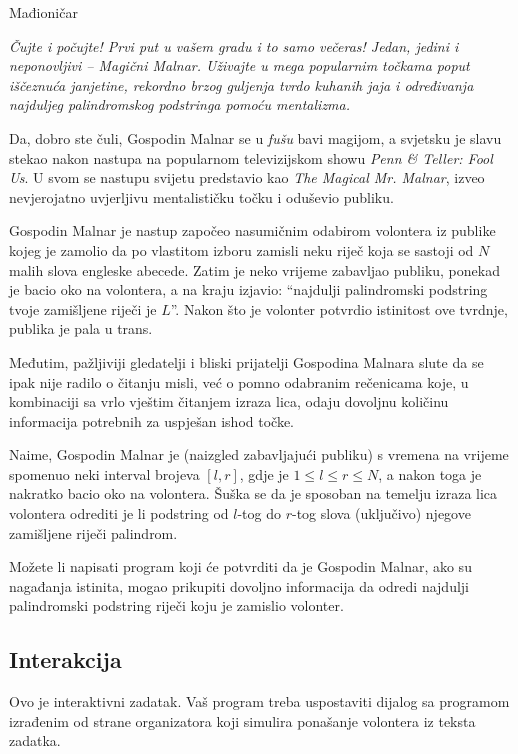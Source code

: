 \begin{statement}[
  problempoints=100,
  timelimit=1 sekunda,
  memorylimit=512 MiB,
]{Mađioničar}

\textit{Čujte i počujte! Prvi put u vašem gradu i to samo večeras! Jedan, jedini i
neponovljivi -- Magični Malnar. Uživajte u mega popularnim točkama poput
iščeznuća janjetine, rekordno brzog guljenja tvrdo kuhanih jaja i određivanja
  najduljeg palindromskog podstringa pomoću mentalizma.}

Da, dobro ste čuli, Gospodin Malnar se u \textit{fušu} bavi magijom, a svjetsku
je slavu stekao nakon nastupa na popularnom televizijskom showu
\textit{Penn \& Teller: Fool Us}. U svom se nastupu svijetu predstavio kao
\textit{The Magical Mr. Malnar}, izveo nevjerojatno uvjerljivu mentalističku
točku i oduševio publiku.

Gospodin Malnar je nastup započeo nasumičnim odabirom volontera iz publike kojeg
je zamolio da po vlastitom izboru zamisli neku riječ koja se sastoji od $N$
malih slova engleske abecede. Zatim je neko vrijeme zabavljao publiku, ponekad
je bacio oko na volontera, a na kraju izjavio: ``najdulji palindromski podstring
tvoje zamišljene riječi je $L$''. Nakon što je volonter potvrdio istinitost ove
tvrdnje, publika je pala u trans.

Međutim, pažljiviji gledatelji i bliski prijatelji Gospodina Malnara slute da
se ipak nije radilo o čitanju misli, već o pomno odabranim rečenicama koje, u
kombinaciji sa vrlo vještim čitanjem izraza lica, odaju dovoljnu količinu
informacija potrebnih za uspješan ishod točke.

Naime, Gospodin Malnar je (naizgled zabavljajući publiku) s vremena na vrijeme
spomenuo neki interval brojeva $[l, r]$, gdje je $1 \le l \le r \le N$, a
nakon toga je nakratko bacio oko na volontera. Šuška se da je sposoban na
temelju izraza lica volontera odrediti je li podstring od $l$-tog do $r$-tog
slova (uključivo) njegove zamišljene riječi palindrom.

Možete li napisati program koji će potvrditi da je Gospodin Malnar, ako su
nagađanja istinita, mogao prikupiti dovoljno informacija da odredi najdulji
palindromski podstring riječi koju je zamislio volonter.

\subsection*{Interakcija}
Ovo je interaktivni zadatak. Vaš program treba uspostaviti dijalog sa programom
izrađenim od strane organizatora koji simulira ponašanje volontera iz teksta
zadatka.


\end{statement}
